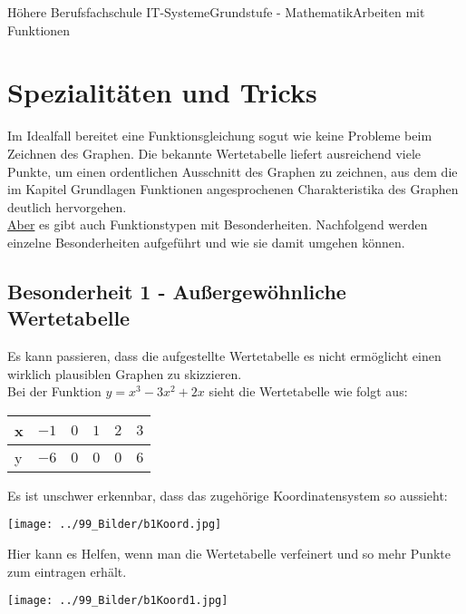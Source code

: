 \documentclass[11pt,twocolumn,oneside,openany,headings=optiontotoc,11pt,numbers=noenddot]{article}
\begin{document}
	\begin{worksheet}{Höhere Berufsfachschule IT-Systeme}{Grundstufe - Mathematik}{Arbeiten mit Funktionen}
		\setcounter{section}{0}
		\section{Spezialitäten und Tricks}
		Im Idealfall bereitet eine Funktionsgleichung sogut wie keine Probleme beim Zeichnen des Graphen. Die bekannte Wertetabelle liefert ausreichend viele Punkte, um einen ordentlichen Ausschnitt des Graphen zu zeichnen, aus dem die im Kapitel \glqq{}Grundlagen Funktionen\grqq{} angesprochenen Charakteristika des Graphen deutlich hervorgehen.\\
		\underline{Aber} es gibt auch Funktionstypen mit Besonderheiten. Nachfolgend werden einzelne Besonderheiten aufgeführt und wie sie damit umgehen können.
		\subsection{Besonderheit 1 - Außergewöhnliche Wertetabelle}
		Es kann passieren, dass die aufgestellte Wertetabelle es nicht ermöglicht einen wirklich plausiblen Graphen zu skizzieren.\\
		Bei der Funktion \(y = x^3-3x^2 + 2x\) sieht die Wertetabelle wie folgt aus:
		\begin{tabularx}{0.5\textwidth}{|l|X|X|X|X|X|}
			x & \(-1\) & \(0\) & \(1\) & \(2\) & \(3\)\\
			\hline
			y & \(-6\) & \(0\) & \(0\) & \(0\) & \(6\)
		\end{tabularx}
		Es ist unschwer erkennbar, dass das zugehörige Koordinatensystem so aussieht:\\
		\par\bigskip\noindent
		\texttt{[image: ../99\_Bilder/b1Koord.jpg]}\\
		\par\bigskip\noindent
		Hier kann es Helfen, wenn man die Wertetabelle verfeinert und so mehr Punkte zum eintragen erhält.\\
		\par\bigskip\noindent
		\texttt{[image: ../99\_Bilder/b1Koord1.jpg]}\\

\end{worksheet}
\end{document}
